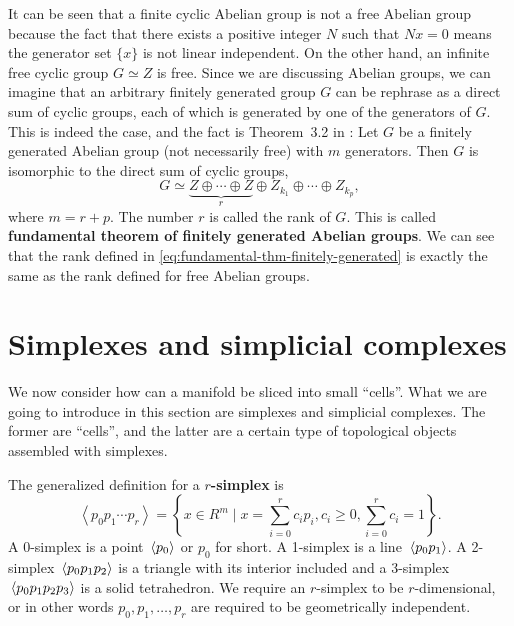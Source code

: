 \documentclass[hyperref, a4paper]{article}
\newcommand*{\concept}[1]{{\textbf{#1}}}
\def\mathbb#1{#1}%
\begin{document}
It can be seen that a finite cyclic Abelian group is not a free Abelian group because the fact that there exists a positive 
integer $N$ such that $Nx = 0$ means the generator set $\{x\}$ is not linear independent.
On the other hand, an infinite free cyclic group $G \simeq \mathbb{Z}$ is free.
Since we are discussing Abelian groups, we can imagine that an arbitrary finitely generated group $G$ can be 
rephrase as a direct sum of cyclic groups, each of which is generated by one of the generators of $G$.
This is indeed the case, and the fact is Theorem~3.2 in \cite{nakahara}: 
Let $G$ be a finitely generated Abelian group (not necessarily free) with $m$ generators. 
Then $G$ is isomorphic to the direct sum of cyclic groups,
\begin{equation}
    G \simeq \underbrace{\mathbb{Z} \oplus \cdots \oplus \mathbb{Z}}_{r} \oplus \mathbb{Z}_{k_{1}} \oplus \cdots \oplus \mathbb{Z}_{k_{p}},
    \label{eq:fundamental-thm-finitely-generated}
\end{equation}
where $m=r+p$. The number $r$ is called the rank of $G$.
This is called \concept{fundamental theorem of finitely generated Abelian groups}.
We can see that the rank defined in \eqref{eq:fundamental-thm-finitely-generated} is exactly the same as the rank defined for 
free Abelian groups.

\section{Simplexes and simplicial complexes}

We now consider how can a manifold be sliced into small ``cells''.  
What we are going to introduce in this section 
are simplexes and simplicial complexes. The former are ``cells'', and the latter are a certain type of topological 
objects assembled with simplexes. 

The generalized definition for a \concept{$r$-simplex} is 
\begin{equation}
    \left\langle p_{0} p_{1} \cdots p_{r}\right\rangle=\left\{x \in \mathbb{R}^{m} \mid x=\sum_{i=0}^{r} c_{i} p_{i}, c_{i} \geq 0, \sum_{i=0}^{r} c_{i}=1\right\}.
\end{equation}
A 0-simplex is a point $\expval*{p_0}$ or $p_0$ for short. A 1-simplex is a line $\expval*{p_0 p_1}$. 
A 2-simplex $\expval*{p_0 p_1 p_2}$ is a triangle with its interior included 
and a 3-simplex $\expval*{p_0 p_1 p_2 p_3}$ is a solid tetrahedron.
We require an $r$-simplex to be $r$-dimensional, or in other words $p_0, p_1, \ldots, p_r$ are required 
to be geometrically independent.
\end{document}
